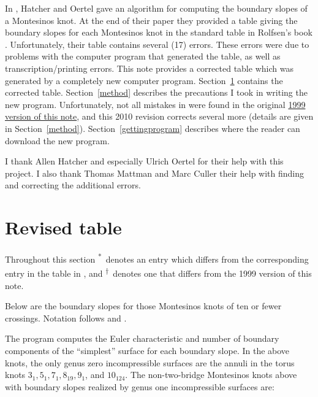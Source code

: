 \documentclass{elsart}
\makeatletter
\newcommand{\error}{\textsuperscript{*}}
\newcommand{\errortwoalone}{\textsuperscript{$\dagger$}}
\newenvironment{semitable}
               {\small
                 \let\\\@centercr
                 \list{}{\itemsep      \z@
                        \itemindent   -1.5em%
                        \listparindent\itemindent
                        \rightmargin  0.0em
                        }%
                \item\relax}
               {\endlist}
\makeatother
\begin{document}
In \cite{HatcherOertel}, Hatcher and Oertel gave an algorithm for
computing the boundary slopes of a Montesinos knot.  At the end of
their paper they provided a table giving the boundary slopes for each
Montesinos knot in the standard table in Rolfsen's book
\cite{Rolfsen76}.  Unfortunately, their table contains several (17)
errors.  These errors were due to problems with the computer program
that generated the table, as well as transcription/printing errors.
This note provides a corrected table which was generated by a
completely new computer program.  Section~\ref{table} contains the
corrected table.  Section~\ref{method} describes the precautions I
took in writing the new program.  Unfortunately, not all mistakes in
\cite{HatcherOertel} were found in the original
\href{http://arxiv.org/abs/math.GT/9901120v2}{1999 version of this
  note}, and this 2010 revision corrects several more (details are
given in Section~\ref{method}).   Section~\ref{gettingprogram} describes
where the reader can download the new program.

I thank Allen Hatcher and especially Ulrich Oertel for their help with
this project.  I also thank Thomas Mattman and Marc Culler their help
with finding and correcting the additional errors.

\section{Revised table}\label{table}

Throughout this section \error\ denotes an entry which differs from
the corresponding entry in the table in \cite{HatcherOertel}, and
\errortwoalone\ denotes one that differs from the 1999 version of this note. 

Below are the boundary slopes for those Montesinos knots of ten or
fewer crossings.  Notation follows \cite{HatcherOertel} and
\cite{Rolfsen76}.

\begin{semitable}

\end{semitable}

The program computes the Euler characteristic and number of boundary
components of the ``simplest'' surface for each boundary slope.  In
the above knots, the only genus zero incompressible surfaces are the
annuli in the torus knots $3_1, 5_1, 7_1, 8_{19}, 9_1$, and $10_{124}$.
The non-two-bridge Montesinos knots above with boundary slopes realized
by genus one incompressible surfaces are:

%
%
\end{document}
